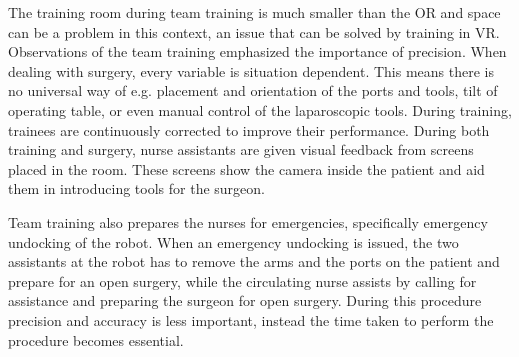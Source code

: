 \documentclass[conference]{IEEEtran}
\begin{document}
The training room during team training is much smaller than the OR and space can be a problem in this context, an issue that can be solved by training in VR. Observations of the team training emphasized the importance of precision. When dealing with surgery, every variable is situation dependent. This means there is no universal way of e.g. placement and orientation of the ports and tools, tilt of operating table, or even manual control of the laparoscopic tools. During training, trainees are continuously corrected to improve their performance. During both training and surgery, nurse assistants are given visual feedback from screens placed in the room. These screens show the camera inside the patient and aid them in introducing tools for the surgeon.

Team training also prepares the nurses for emergencies, specifically emergency undocking of the robot. When an emergency undocking is issued, the two assistants at the robot has to remove the arms and the ports on the patient and prepare for an open surgery, while the circulating nurse assists by calling for assistance and preparing the surgeon for open surgery. During this procedure precision and accuracy is less important, instead the time taken to perform the procedure becomes essential. 


%
\end{document}
